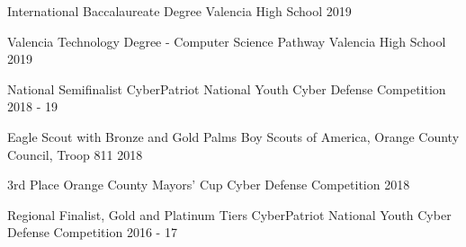 



\begin{cvhonors}

  \cvhonor
    {International Baccalaureate Degree} %
    {Valencia High School} %
    {} %
    {2019} %

  \cvhonor
    {Valencia Technology Degree - Computer Science Pathway} %
    {Valencia High School} %
    {} %
    {2019} %

  \cvhonor
    {National Semifinalist} %
    {CyberPatriot National Youth Cyber Defense Competition} %
    {} %
    {2018 - 19} %
    
  \cvhonor
    {Eagle Scout with Bronze and Gold Palms} %
    {Boy Scouts of America, Orange County Council, Troop 811} %
    {} %
    {2018} %

  \cvhonor
    {3rd Place} %
    {Orange County Mayors' Cup Cyber Defense Competition} %
    {} %
    {2018} %

  \cvhonor
    {Regional Finalist, Gold and Platinum Tiers} %
    {CyberPatriot National Youth Cyber Defense Competition} %
    {} %
    {2016 - 17} %

\end{cvhonors}





